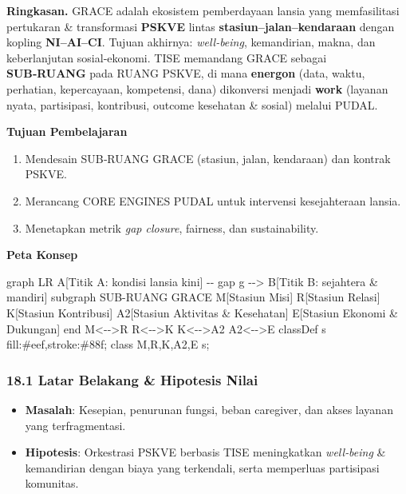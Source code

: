 \documentclass[
  letterpaper,
  DIV=11,
  numbers=noendperiod]{scrartcl}
\newenvironment{Shaded}{\begin{snugshade}}{\end{snugshade}}
\newcommand{\NormalTok}[1]{\textcolor[rgb]{0.00,0.23,0.31}{#1}}
\providecommand{\tightlist}{%
  \setlength{\itemsep}{0pt}\setlength{\parskip}{0pt}}
\begin{document}
\textbf{Ringkasan.} GRACE adalah ekosistem pemberdayaan lansia yang
memfasilitasi pertukaran \& transformasi \textbf{PSKVE} lintas
\textbf{stasiun--jalan--kendaraan} dengan kopling \textbf{NI--AI--CI}.
Tujuan akhirnya: \emph{well‑being}, kemandirian, makna, dan
keberlanjutan sosial‑ekonomi. TISE memandang GRACE sebagai
\textbf{SUB‑RUANG} pada RUANG PSKVE, di mana \textbf{energon} (data,
waktu, perhatian, kepercayaan, kompetensi, dana) dikonversi menjadi
\textbf{work} (layanan nyata, partisipasi, kontribusi, outcome kesehatan
\& sosial) melalui PUDAL.

\textbf{Tujuan Pembelajaran}

\begin{enumerate}
\def\labelenumi{\arabic{enumi}.}
\tightlist
\item
  Mendesain SUB‑RUANG GRACE (stasiun, jalan, kendaraan) dan kontrak
  PSKVE.
\item
  Merancang CORE ENGINES PUDAL untuk intervensi kesejahteraan lansia.
\item
  Menetapkan metrik \emph{gap closure}, fairness, dan sustainability.
\end{enumerate}

\textbf{Peta Konsep}

\begin{Shaded}
\begin{Highlighting}[]
\NormalTok{graph LR}
\NormalTok{  A[Titik A: kondisi lansia kini] {-}{-} gap g {-}{-}\textgreater{} B[Titik B: sejahtera \& mandiri]}
\NormalTok{  subgraph SUB{-}RUANG GRACE}
\NormalTok{    M[Stasiun Misi]}
\NormalTok{    R[Stasiun Relasi]}
\NormalTok{    K[Stasiun Kontribusi]}
\NormalTok{    A2[Stasiun Aktivitas \& Kesehatan]}
\NormalTok{    E[Stasiun Ekonomi \& Dukungan]}
\NormalTok{  end}
\NormalTok{  M\textless{}{-}{-}\textgreater{}R}
\NormalTok{  R\textless{}{-}{-}\textgreater{}K}
\NormalTok{  K\textless{}{-}{-}\textgreater{}A2}
\NormalTok{  A2\textless{}{-}{-}\textgreater{}E}
\NormalTok{  classDef s fill:\#eef,stroke:\#88f;}
\NormalTok{  class M,R,K,A2,E s;}
\end{Highlighting}
\end{Shaded}

\subsubsection{18.1 Latar Belakang \& Hipotesis
Nilai}\label{latar-belakang-hipotesis-nilai}

\begin{itemize}
\tightlist
\item
  \textbf{Masalah}: Kesepian, penurunan fungsi, beban caregiver, dan
  akses layanan yang terfragmentasi.
\item
  \textbf{Hipotesis}: Orkestrasi PSKVE berbasis TISE meningkatkan
  \emph{well‑being} \& kemandirian dengan biaya yang terkendali, serta
  memperluas partisipasi komunitas.
\end{itemize}
\end{document}
